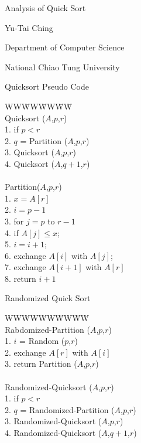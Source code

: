 \documentclass{beamer}
\begin{document}
\begin{frame}{}

\vspace{1in}
\centerline{\Large Analysis of Quick Sort}
\vspace{0.5cm}
\centerline{Yu-Tai Ching}
\centerline{Department of Computer Science}
\centerline{National Chiao Tung University} 
\end{frame}

\begin{frame}{Quicksort Pseudo Code}

\begin{tabbing}
WW\=WW\=WW\=WW\= \kill \\
{\sc Quicksort} ($A$,$p$,$r$) \\
1. \> if $p<r$ \\
2. \> \> $q$ = {\sc Partition} ($A$,$p$,$r$) \\
3. \> \> {\sc Quicksort} ($A$,$p$,$r$) \\
4. \>\> {\sc Quicksort} ($A$,$q+1$,$r$) \\
\ \\
{\sc Partition}($A$,$p$,$r$) \\
1. \> $x=A[r]$ \\
2. \> $i=p-1$ \\
3. \> for $j=p$ to $r-1$ \\
4. \> \> if $A[j] \le x$; \\
5. \>\>\> $i=i+1$; \\
6.\>\>\> exchange $A[i]$ with $A[j]$; \\
7. \> exchange $A[i+1]$ with $A[r]$ \\
8. return $i+1$
\end{tabbing}
\end{frame}

\begin{frame}{Randomized Quick Sort}

\begin{tabbing}
WW\=WW\=WW\=WW\=WW\= \kill \\
{\sc Rabdomized-Partition} ($A$,$p$,$r$) \\
1. \> $i$ = {\sc Random} ($p$,$r$) \\
2. \> exchange $A[r]$ with $A[i]$ \\
3. \> return {\sc Partition} ($A$,$p$,$r$) \\
\ \\
{\sc Randomized-Quicksort} ($A$,$p$,$r$) \\
1. \> if $p<r$ \\
2. \>\> $q$ = {\sc Randomized-Partition} ($A$,$p$,$r$) \\
3. \>\> {\sc Randomized-Quicksort} ($A$,$p$,$r$) \\
4. \>\> {\sc Randomized-Quicksort} ($A$,$q+1$,$r$)
\end{tabbing}
\end{frame}
\end{document}
